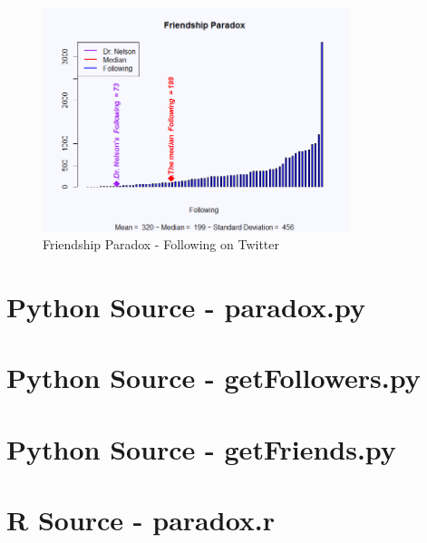 \documentclass[letterpaper,11pt]{report}
\begin{document}
\begin{savenotes}
\begin{figure}[htbp]
	\centering
		\includegraphics[width=0.80\textwidth]{followingParadox.png}
	\caption{Friendship Paradox - Following on Twitter}
	\label{fig:followingParadox}
\end{figure}

\end{savenotes}




\appendix
{}

\chapter{Python Source - paradox.py} \label{chap:paradox}

\chapter{Python Source - getFollowers.py} \label{chap:getFollowers}

\chapter{Python Source - getFriends.py} \label{chap:getFriends}


\chapter{R Source - paradox.r} \label{chap:p}

\end{document}
